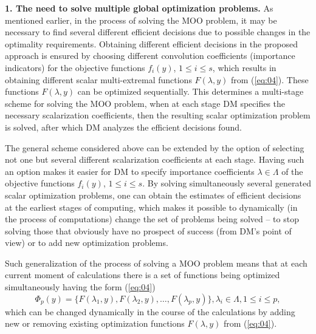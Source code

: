 \documentclass[runningheads]{llncs}
\begin{document}
\textbf{1. The need to solve multiple global optimization problems.} As mentioned earlier, in the process of solving the MOO problem, it may be necessary to find several different efficient decisions due to possible changes in the optimality requirements. Obtaining different efficient decisions in the proposed approach is ensured by choosing different convolution coefficients (importance indicators) for the objective functions $f_i(y)$, $1 \leq i \leq s$, which results in obtaining different  scalar multi-extremal functions $F(\lambda, y)$ from (\ref{eq:04}). These functions $F(\lambda, y)$ can be optimized sequentially. This determines a multi-stage scheme for solving the MOO problem, when at each stage DM specifies the necessary scalarization coefficients, then the resulting scalar optimization problem is solved, after which DM analyzes the efficient decisions found. 

The general scheme considered above can be extended by the option of selecting not one but several different scalarization coefficients at each stage. Having such an option makes it easier for DM  to specify importance coefficients $\lambda \in \Lambda$ of the objective functions $f_i(y)$, $1 \leq i \leq s$. By solving simultaneously several generated scalar optimization problems, one can  obtain the estimates of efficient decisions at the earliest stages of computing, which makes it possible to dynamically (in the process of computations) change the set of problems being solved -- to stop solving those that obviously have no prospect of success (from DM's point of view) or to add new optimization problems. 

Such generalization of the process of solving a MOO problem means that at each current moment of calculations there is a set of functions being optimized simultaneously having the form (\ref{eq:04})
\begin{equation}
\label{eq:21}
\Phi_p (y)=\{ F(\lambda_1,y), F(\lambda_2,y),\dots,F(\lambda_p,y)  \},  \lambda_i \in \Lambda, 1 \leq i \leq p,
\end{equation}
which can be changed dynamically in the course of the calculations by adding new or removing existing optimization functions $F(\lambda, y)$ from (\ref{eq:04}). 
\end{document}

